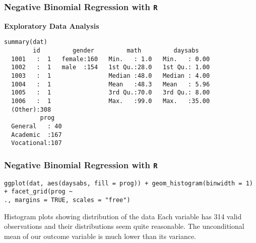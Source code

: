 \documentclass[00-GLMregslides.tex]{subfiles}
\begin{document}


\begin{frame}[fragile]
\frametitle{Negative Binomial Regression with \texttt{R} }
\normalsize
\textbf{Exploratory Data Analysis}
\begin{framed}
\begin{verbatim}	
summary(dat)
        id         gender         math         daysabs     
  1001   :  1   female:160   Min.   : 1.0   Min.   : 0.00  
  1002   :  1   male  :154   1st Qu.:28.0   1st Qu.: 1.00  
  1003   :  1                Median :48.0   Median : 4.00  
  1004   :  1                Mean   :48.3   Mean   : 5.96  
  1005   :  1                3rd Qu.:70.0   3rd Qu.: 8.00  
  1006   :  1                Max.   :99.0   Max.   :35.00  
  (Other):308                                              
          prog    
  General   : 40  
  Academic  :167  
  Vocational:107  
\end{verbatim}	
\end{framed}

	
               
\end{frame}
\begin{frame}[fragile]
	\frametitle{Negative Binomial Regression with \texttt{R} }
	\Large

\begin{verbatim}	
ggplot(dat, aes(daysabs, fill = prog)) + geom_histogram(binwidth = 1) + facet_grid(prog ~ 
., margins = TRUE, scales = "free")
\end{verbatim}
Histogram plots showing distribution of the data
Each variable has 314 valid observations and their distributions seem quite reasonable. The unconditional mean of our outcome variable is much lower than its variance.
\end{frame}
\end{document}
